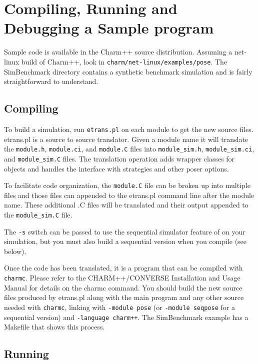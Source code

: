 \section{Compiling, Running and Debugging a Sample \pose{} program}

Sample code is available in the Charm++ source distribution.  Assuming a
net-linux build of Charm++, look in {\tt charm/net-linux/examples/pose}.
The SimBenchmark directory contains a synthetic benchmark simulation and is
fairly straightforward to understand.

\subsection{Compiling}

To build a \pose{} simulation, run {\tt etrans.pl} on each \pose{}
module to get the new source files.  {etrans.pl} is a source to source
translator.  Given a module name it will translate the {\tt module.h},
{\tt module.ci}, and {\tt module.C} files into {\tt module\_sim.h},
{\tt module\_sim.ci}, and {\tt module\_sim.C} files.  The translation
operation adds wrapper classes for \pose{} objects and handles the
interface with strategies and other poser options.

To facilitate code organization, the {\tt module.C} file can be broken
up into multiple files and those files can appended to the {etrans.pl}
command line after the module name.  These additional .C files will be
translated and their output appended to the {\tt module\_sim.C} file.

The {\tt -s} switch can be passed to use the sequential simulator feature
of \pose{} on your simulation, but you must also build a sequential
version when you compile (see below).

Once the code has been translated, it is a \charmpp{} program that can
be compiled with {\tt charmc}.  Please refer to the CHARM++/CONVERSE
Installation and Usage Manual for details on the charmc command.  You
should build the new source files produced by etrans.pl along with the
main program and any other source needed with {\tt charmc}, linking
with {\tt -module pose} (or {\tt -module seqpose} for a sequential
version) and {\tt -language charm++}.  The SimBenchmark example has a
Makefile that shows this process.

\subsection{Running} 


